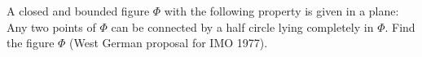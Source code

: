 A closed and bounded figure $\Phi$ with the following property is given in a plane: Any two points of $\Phi$ can be connected by a half circle lying completely in $\Phi$. Find the figure $\Phi$ (West German proposal for IMO 1977).
